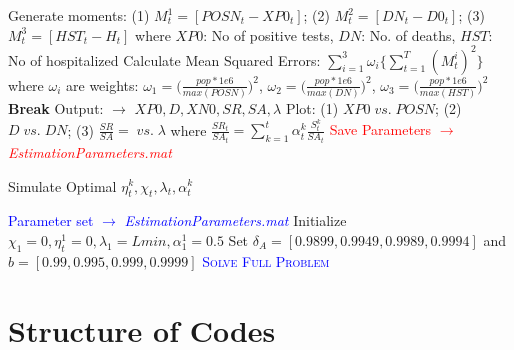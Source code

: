 \documentclass{../cls/NotesV2_Class}
\begin{document}
\begin{algorithm}
\begin{algorithmic}
			\STATE Generate moments: (1) $M^1_t=[POSN_t - XP0_t]$; (2) $M^2_t=[DN_t-D0_t]$; (3) $M_t^3=[HST_t-H_t]$
			where $XP0$: No of positive tests, $DN$: No. of deaths, $HST$: No of hospitalized
			\STATE Calculate Mean Squared Errors: $\sum_{i=1}^3\omega_i\{\sum_{t=1}^T(M^{i}_t)^{2}\}$ where $\omega_i$ are weights: $\omega_1 = \big(\frac{pop*1e6}{max(POSN)}\big)^2$, $\omega_2 = \big(\frac{pop*1e6}{max(DN)}\big)^2$, $\omega_3 = \big(\frac{pop*1e6}{max(HST)}\big)^2$
			\STATE \textbf{Break}
			\ENDIF
		\ENDWHILE
		\ENSURE Output: $\rightarrow$ $XP0,D,XN0,SR,SA,\lambda$
		\ENSURE Plot: (1) $XP0\;vs.\;POSN$; (2) $D\;vs.\;DN$; (3) $\frac{SR}{SA}=\;vs.\;\lambda$ where $\frac{SR_t}{SA_t}=\sum_{k=1}^t\alpha^k_t\frac{S^k_t}{SA_t}$
		\ENSURE \textcolor{red}{Save Parameters $\rightarrow$ \textit{EstimationParameters.mat}}
	\end{algorithmic}
\end{algorithm}


\begin{algorithm}
	\caption{Simulate Optimal $\eta^k_t, \chi_t, \lambda_t, \alpha^k_t$}
	\begin{algorithmic}
			\REQUIRE \textcolor{blue}{Parameter set $\rightarrow$ \textit{EstimationParameters.mat}}
			\STATE Initialize $\chi_1=0, \eta^1_t=0, \lambda_1=Lmin, \alpha^1_1=0.5$
			\STATE Set $\delta_A=[0.9899,0.9949, 0.9989, 0.9994]$ and $b=[0.99, 0.995, 0.999, 0.9999]$
			\STATE \textcolor{blue}{\textsc{Solve Full Problem}}
			\ENDWHILE
			\ENDFOR
	\end{algorithmic}
\end{algorithm}


\section{Structure of Codes}


\end{document}

